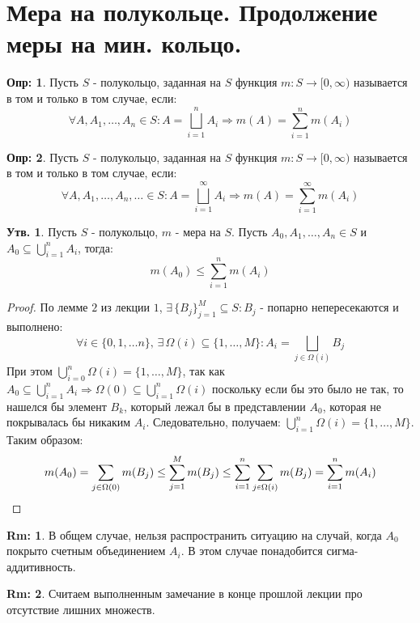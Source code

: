 \documentclass[12pt]{article}
\theoremstyle{definition}
\newtheorem{defn}{Опр:}
\newtheorem{rem}{Rm:}
\newtheorem{prop}{Утв.}
\newcommand{\smallerrel}[1]{\mathrel{\mathpalette\smallerrelaux{#1}}}
\newcommand{\smallerrelaux}[2]{\raisebox{.1ex}{\scalebox{.75}{$#1#2$}}}
\newcommand{\smallin}{\smallerrel{\in}}
\begin{document}

\section*{Мера на полукольце. Продолжение меры на мин. кольцо.}

\begin{defn}
	Пусть $S$ - полукольцо, заданная на $S$ функция $m \colon S \to [0,\infty)$ называется  в том и только в том случае, если: 
	$$ 
		\forall A, A_1, \dotsc, A_n \in S \colon A = \bigsqcup\limits_{i=1}^{n} A_i \Rightarrow m(A) = \sum\limits_{i=1}^{n} m(A_i)
	$$
\end{defn}
\begin{defn}	
	Пусть $S$ - полукольцо, заданная на $S$ функция $m \colon S \to [0,\infty)$ называется  в том и только в том случае, если: 
	$$
		\forall  A, A_1, \dotsc, A_n, \dotsc \in S \colon A = \bigsqcup\limits_{i=1}^{\infty} A_i \Rightarrow m(A) = \sum\limits_{i=1}^{\infty} m(A_i)
	$$
\end{defn}

\begin{prop}
	Пусть $S$ - полукольцо, $m$ - мера на $S$. Пусть $A_0, A_1, \dotsc, A_n \in S$ и $A_0 \subseteq \bigcup\limits_{i=1}^{n}A_i $, тогда:
	$$
		m(A_0) \leq \sum\limits_{i=1}^{n}m(A_i)
	$$
\end{prop}

\begin{proof}
	По лемме $2$ из лекции $1$, $\exists \, \{B_j\}_{j=1}^M \subseteq S \colon B_j$ - попарно непересекаются и выполнено:
	$$
		\forall i \in \{0,1,\dotsc n\}, \, \exists \, \Omega(i) \subseteq \{1, \dotsc, M\} \colon A_i =\bigsqcup\limits_{j \in \Omega(i)}B_j
	$$ 
	При этом $\bigcup\limits_{i=0}^{n} \Omega(i) = \{1,\dotsc,M\}$, так как $A_0 \subseteq \bigcup\limits_{i=1}^n A_i \Rightarrow \Omega(0) \subseteq \bigcup\limits_{i=1}^n \Omega(i)$ поскольку если бы это было не так, то нашелся бы элемент $B_k$, который лежал бы в представлении $A_0$, которая не покрывалась бы никаким $A_i$. Следовательно, получаем: $\bigcup\limits_{i=1}^n \Omega(i) = \{1,\dotsc,M\}$. Таким образом: $$
		m(A_0) = \sum\limits_{j \in \Omega(0)} m(B_j) \leq \sum\limits_{j=1}^M m(B_j) \leq \sum\limits_{i=1}^n\sum\limits_{j\smallin \Omega(i)} m(B_j) = \sum\limits_{i=1}^n m(A_i)
	$$
\end{proof}
\begin{rem}
	В общем случае, нельзя распространить ситуацию на случай, когда $A_0$ покрыто счетным объединением $A_i$. В этом случае понадобится сигма-аддитивность.
\end{rem}
\begin{rem}
	Считаем выполненным замечание в конце прошлой лекции про отсутствие лишних множеств.
\end{rem}
	
\end{document}
